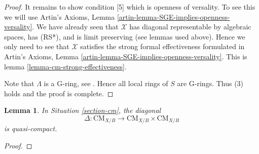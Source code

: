 \documentclass{stacks-project}
\theoremstyle{plain}
\newtheorem{lemma}[subsection]{Lemma}
\theoremstyle{definition}
\theoremstyle{remark}
\numberwithin{equation}{subsection}
\def\CMfunctor{\mathcal{C}\!{\it oh}}
\def\CMfunctor{\text{CM}}
\begin{document}
\begin{proof}
\medskip\noindent
It remains to show condition [5] which is openness of versality.
To see this we will use
Artin's Axioms, Lemma \ref{artin-lemma-SGE-implies-openness-versality}.
We have already seen that $\mathcal{X}$ has diagonal
representable by algebraic spaces, has (RS*), and is limit preserving
(see lemmas used above).
Hence we only need to see that $\mathcal{X}$ satisfies the strong
formal effectiveness formulated in
Artin's Axioms, Lemma \ref{artin-lemma-SGE-implies-openness-versality}.
This is lemma \ref{lemma-cm-strong-effectiveness}.

\medskip\noindent
Note that $\Lambda$ is a G-ring, see
\cite[Tag 07PX]{stacks-project}.
Hence all local rings of $S$ are G-rings. Thus (3) holds and the proof is complete.
\end{proof}
\begin{lemma}
	In Situation \ref{section-cm}, the diagonal
	\[\Delta:\CMfunctor_{X/B}\rightarrow\CMfunctor_{X/B}\times\CMfunctor_{X/B}\]
	is quasi-compact.
\end{lemma}
\begin{proof}
	
\end{proof}


\end{document}
